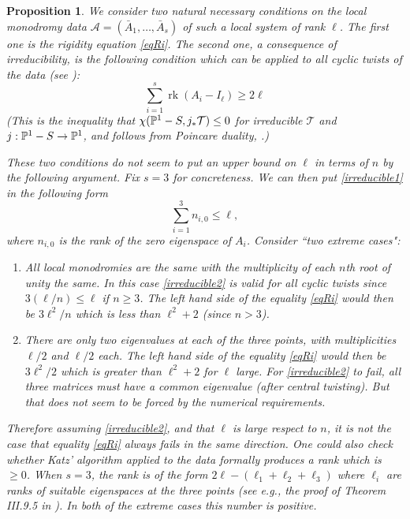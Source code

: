 \documentclass[11pt]{amsart}
\newcommand\rk{\operatorname{rk}}
\newtheorem{proposition}[theorem]{Proposition}
\numberwithin{theorem}{subsection}
\begin{document}
{\begin{proposition}
We consider
two natural  necessary conditions on the local monodromy data $\mathcal{A}=(\bar{A}_1,\dots,\bar{A}_s)$ of such a local system of rank $\ell$. The first one is the rigidity equation  \eqref{eqRi}. The second one, a consequence of irreducibility, is the following condition  which can be applied to all cyclic twists of the data (see \cite[Lemma III.9.10]{MM}):
\begin{equation}\label{irreducible1}
\sum_{i=1}^s \rk(A_i-I_{\ell})\geq 2\ell
\end{equation}
(This is the inequality that $\chi(\Bbb{P}^1-S, j_*\mathcal{T})\leq 0$ for irreducible $\mathcal{T}$ and $j:\Bbb{P}^1-S\to \Bbb{P}^1$, and follows from Poincare duality, \cite[Section 1.1]{Katz}.)

These two conditions do not seem to put an upper bound on $\ell$ in terms of $n$ by the following argument. Fix $s=3$ for concreteness. We can then put \eqref{irreducible1} in the following form
\begin{equation}\label{irreducible2}
\sum_{i=1}^3 n_{i,0}\leq \ell,
\end{equation}
where $n_{i,0}$ is the rank of the zero eigenspace of $A_i$.
Consider ``two extreme cases":
\begin{enumerate}
\item All local monodromies are the same with the multiplicity of each $n$th root of unity the same.
In this case \eqref{irreducible2} is valid  for all cyclic twists since $3(\ell/n)\leq \ell$ if $n\geq 3$. The left hand side of  the equality \eqref{eqRi} would then be $3\ell^2/n$ which is less than $\ell^2+2$ (since $n>3$).
\item There are only two eigenvalues at each of the  three points, with multiplicities $\ell/2$ and $\ell/2$ each. The left hand side of the equality \eqref{eqRi} would then be $3\ell^2/2$ which is greater than $\ell^2+2$ for  $\ell$ large. For \eqref{irreducible2} to fail, all three matrices must have a common eigenvalue (after central twisting). But that does not seem to be forced by the numerical requirements.
\end{enumerate}
Therefore assuming \eqref{irreducible2}, and  that $\ell$ is large  respect to $n$, it is not the case that equality \eqref{eqRi} always fails in the same direction. One could also check whether Katz' algorithm
applied to the data formally produces a rank which is $\geq 0$. When $s=3$, the rank is of the form $2\ell -(\ell_1 +\ell_2+\ell_3)$ where $\ell_i$ are ranks of suitable eigenspaces at the three points (see e.g., the proof of Theorem III.9.5 in \cite{MM}). In both of the extreme cases this number is positive.


\end{proposition}}
\end{document}
